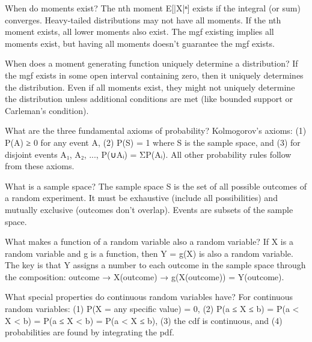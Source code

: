 \documentclass[avery5371,grid]{flashcards}
\begin{document}
\begin{flashcard}{When do moments exist?}
The nth moment E[|X|ⁿ] exists if the integral (or sum) converges. Heavy-tailed distributions may not have all moments. If the nth moment exists, all lower moments also exist. The mgf existing implies all moments exist, but having all moments doesn't guarantee the mgf exists.
\end{flashcard}

\begin{flashcard}{When does a moment generating function uniquely determine a distribution?}
If the mgf exists in some open interval containing zero, then it uniquely determines the distribution. Even if all moments exist, they might not uniquely determine the distribution unless additional conditions are met (like bounded support or Carleman's condition).
\end{flashcard}

\begin{flashcard}{What are the three fundamental axioms of probability?}
Kolmogorov's axioms: (1) P(A) ≥ 0 for any event A, (2) P(S) = 1 where S is the sample space, and (3) for disjoint events A₁, A₂, ..., P(∪Aᵢ) = ΣP(Aᵢ). All other probability rules follow from these axioms.
\end{flashcard}

\begin{flashcard}{What is a sample space?}
The sample space S is the set of all possible outcomes of a random experiment. It must be exhaustive (include all possibilities) and mutually exclusive (outcomes don't overlap). Events are subsets of the sample space.
\end{flashcard}

\begin{flashcard}{What makes a function of a random variable also a random variable?}
If X is a random variable and g is a function, then Y = g(X) is also a random variable. The key is that Y assigns a number to each outcome in the sample space through the composition: outcome → X(outcome) → g(X(outcome)) = Y(outcome).
\end{flashcard}

\begin{flashcard}{What special properties do continuous random variables have?}
For continuous random variables: (1) P(X = any specific value) = 0, (2) P(a ≤ X ≤ b) = P(a < X < b) = P(a ≤ X < b) = P(a < X ≤ b), (3) the cdf is continuous, and (4) probabilities are found by integrating the pdf.
\end{flashcard}
\end{document}
